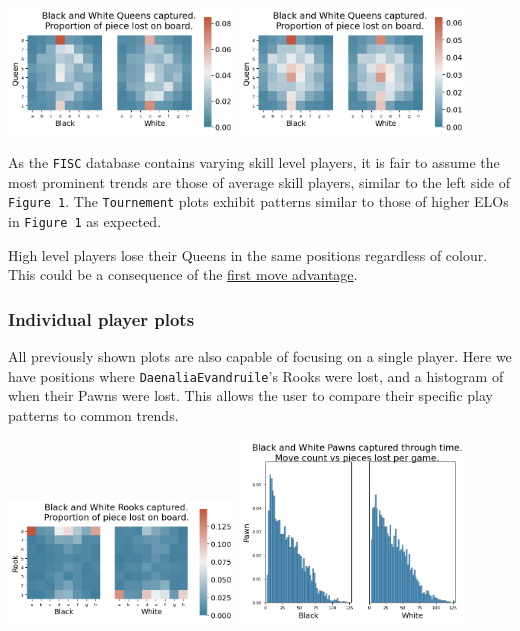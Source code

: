 \documentclass[11pt]{article}
\begin{document}
\begin{center}
\includegraphics[width=0.45\textwidth]{Images/_HEATMAP_Queen_FISC.png}
\includegraphics[width=0.45\textwidth]{Images/_HEATMAP_Queen_TOURNEMENTS.png}
\end{center}

As the \texttt{FISC} database contains varying skill level players, it is fair to assume the most prominent trends are those of average skill players, similar to the left side of \texttt{Figure 1}. The \texttt{Tournement} plots exhibit patterns similar to those of higher ELOs in \texttt{Figure 1} as expected.

High level players lose their Queens in the same positions regardless of colour. This could be a consequence of the \href{https://en.wikipedia.org/wiki/First-move\_advantage\_in\_chess}{first move advantage}.
\subsubsection{Individual player plots}
\label{sec:orga5b9eb0}
All previously shown plots are also capable of focusing on a single player. Here we have positions where \texttt{DaenaliaEvandruile}'s Rooks were lost, and a histogram of when their Pawns were lost. This allows the user to compare their specific play patterns to common trends.

\begin{center}
\includegraphics[width=0.45\textwidth]{Images/DaenaliaEvandruile_HEATMAP_Rook.png}
\includegraphics[width=0.45\textwidth]{Images/DaenaliaEvandruile_HIST_Pawn.png}
\end{center}
\end{document}
